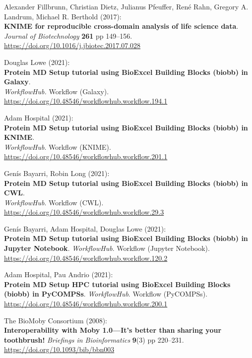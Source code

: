\begin{thebibliography}{9}
Alexander Fillbrunn, Christian Dietz, Julianus Pfeuffer, René
Rahn, Gregory A. Landrum, Michael R. Berthold (2017):\\
\textbf{KNIME for reproducible cross-domain analysis of life science
data}.\\
\emph{Journal of Biotechnology} \textbf{261} pp 149--156.\\
\url{https://doi.org/10.1016/j.jbiotec.2017.07.028}

Douglas Lowe (2021):\\
\textbf{Protein MD Setup tutorial using BioExcel Building Blocks (biobb)
in Galaxy}.\\
\emph{WorkflowHub.} Workflow (Galaxy).\\
\url{https://doi.org/10.48546/workflowhub.workflow.194.1}

Adam Hospital (2021):\\
\textbf{Protein MD Setup tutorial using BioExcel Building Blocks (biobb)
in KNIME}.\\
\emph{WorkflowHub}. Workflow (KNIME).\\
\url{https://doi.org/10.48546/workflowhub.workflow.201.1}

Genís Bayarri, Robin Long (2021):\\
\textbf{Protein MD Setup tutorial using BioExcel Building Blocks (biobb)
in CWL}.\\
\emph{WorkflowHub}. Workflow (CWL).\\
\url{https://doi.org/10.48546/workflowhub.workflow.29.3}

Genís Bayarri, Adam Hospital, Douglas Lowe (2021):\\
\textbf{Protein MD Setup tutorial using BioExcel Building Blocks (biobb)
in Jupyter Notebook}. \emph{WorkflowHub}. Workflow (Jupyter Notebook).\\
\url{https://doi.org/10.48546/workflowhub.workflow.120.2}

Adam Hospital, Pau Andrio (2021):\\
\textbf{Protein MD Setup HPC tutorial using BioExcel Building Blocks
(biobb) in PyCOMPSs}. \emph{WorkflowHub}. Workflow (PyCOMPSs).\\
\url{https://doi.org/10.48546/workflowhub.workflow.200.1}

The BioMoby Consortium (2008):\\
\textbf{Interoperability with Moby 1.0---It's better than sharing your
toothbrush!} \emph{Briefings in Bioinformatics} \textbf{9}(3) pp
220--231.\\
\url{https://doi.org/10.1093/bib/bbn003}


\end{thebibliography}
